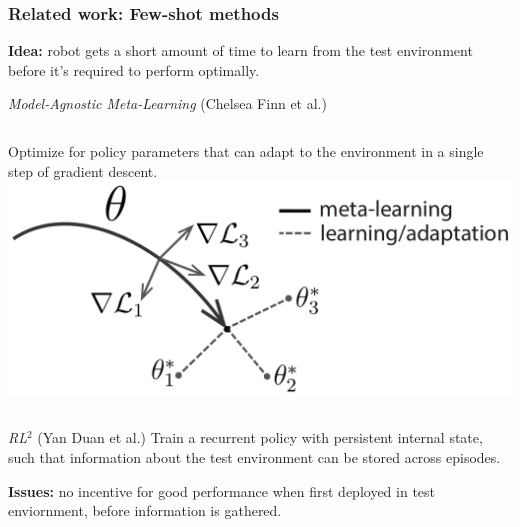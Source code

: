 \documentclass{beamer}
\begin{document}
\begin{frame}
\frametitle{Related work: Few-shot methods}
\textbf{Idea:} robot gets a short amount of time to learn from the test environment before it's required to perform optimally.

\begin{block}{\emph{Model-Agnostic Meta-Learning} (Chelsea Finn et al.)}
\begin{columns}
Optimize for policy parameters that can adapt to the environment in a single step of gradient descent.
\includegraphics[width=\columnwidth]{maml.png}
\end{columns}
\end{block}
\begin{block}{\emph{RL$^2$} (Yan Duan et al.)}
Train a recurrent policy with persistent internal state,
such that information about the test environment can be stored across episodes.
\end{block}
\textbf{Issues:}
no incentive for good performance when first deployed in test enviornment,
before information is gathered.
\end{frame}
\end{document}
